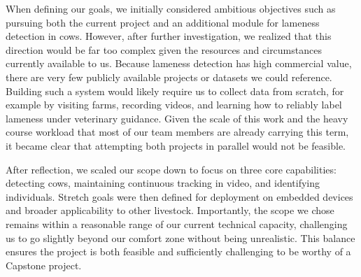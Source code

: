 \documentclass{article}
\begin{document}
\begin{enumerate}
    When defining our goals, we initially considered ambitious objectives such as pursuing 
    both the current project and an additional module for lameness detection in cows. 
    However, after further investigation, we realized that this direction would be far too 
    complex given the resources and circumstances currently available to us. Because lameness 
    detection has high commercial value, there are very few publicly available projects or 
    datasets we could reference. Building such a system would likely require us to collect data 
    from scratch, for example by visiting farms, recording videos, and learning how to reliably 
    label lameness under veterinary guidance. Given the scale of this work and the heavy 
    course workload that most of our team members are already carrying this term, it became 
    clear that attempting both projects in parallel would not be feasible. 

    After reflection, we scaled our scope down to focus on three core capabilities: detecting 
    cows, maintaining continuous tracking in video, and identifying individuals. Stretch goals 
    were then defined for deployment on embedded devices and broader applicability to other 
    livestock. Importantly, the scope we chose remains within a reasonable range of our current 
    technical capacity, challenging us to go slightly beyond our comfort zone without being 
    unrealistic. This balance ensures the project is both feasible and sufficiently challenging 
    to be worthy of a Capstone project.


\end{enumerate}  
\end{document}
